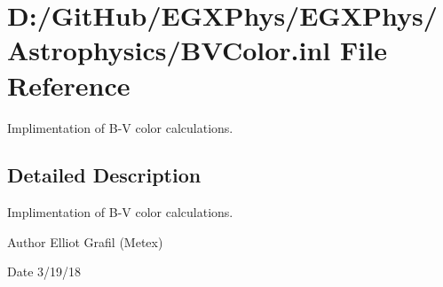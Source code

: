 \hypertarget{_b_v_color_8inl}{}\section{D\+:/\+Git\+Hub/\+E\+G\+X\+Phys/\+E\+G\+X\+Phys/\+Astrophysics/\+B\+V\+Color.inl File Reference}
\label{_b_v_color_8inl}


Implimentation of B-\/V color calculations.  




\subsection{Detailed Description}
Implimentation of B-\/V color calculations. 

\begin{DoxyAuthor}{Author}
Elliot Grafil (Metex) 
\end{DoxyAuthor}
\begin{DoxyDate}{Date}
3/19/18 
\end{DoxyDate}

